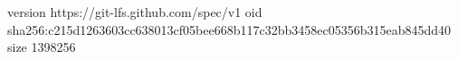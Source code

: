 version https://git-lfs.github.com/spec/v1
oid sha256:c215d1263603cc638013cf05bee668b117c32bb3458ec05356b315eab845dd40
size 1398256
